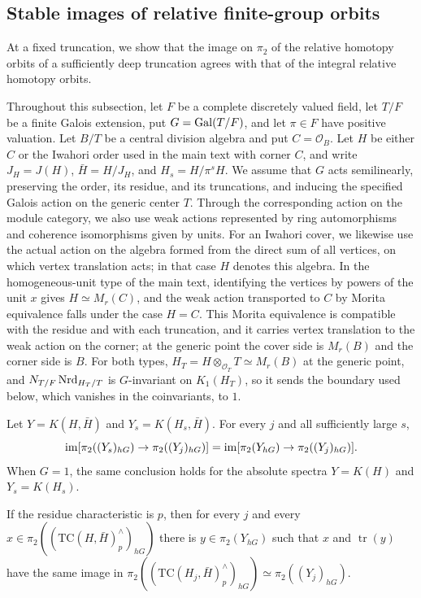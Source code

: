 \subsection{Stable images of relative finite-group orbits}
At a fixed truncation, we show that the image on $\pi_2$ of the relative homotopy orbits of a sufficiently deep truncation agrees with that of the integral relative homotopy orbits.

Throughout this subsection, let $F$ be a complete discretely valued field, let $T/F$ be a finite Galois extension, put $G=\operatorname{Gal}(T/F)$, and let $\pi\in F$ have positive valuation.
Let $B/T$ be a central division algebra and put $C=\mathcal O_B$.
Let $H$ be either $C$ or the Iwahori order used in the main text with corner $C$, and write $J_H=J(H)$, $\bar H=H/J_H$, and $H_s=H/\pi^sH$.
We assume that $G$ acts semilinearly, preserving the order, its residue, and its truncations, and inducing the specified Galois action on the generic center $T$.
Through the corresponding action on the module category, we also use weak actions represented by ring automorphisms and coherence isomorphisms given by units.
For an Iwahori cover, we likewise use the actual action on the algebra formed from the direct sum of all vertices, on which vertex translation acts; in that case $H$ denotes this algebra.
In the homogeneous-unit type of the main text, identifying the vertices by powers of the unit $x$ gives $H\simeq M_r(C)$, and the weak action transported to $C$ by Morita equivalence falls under the case $H=C$.
This Morita equivalence is compatible with the residue and with each truncation, and it carries vertex translation to the weak action on the corner; at the generic point the cover side is $M_r(B)$ and the corner side is $B$.
For both types, $H_T=H\otimes_{\mathcal O_T}T\simeq M_r(B)$ at the generic point, and $N_{T/F}\operatorname{Nrd}_{H_T/T}$ is $G$-invariant on $K_1(H_T)$, so it sends the boundary used below, which vanishes in the coinvariants, to $1$.

\begin{lemma}
\label{lem:app-orbit-stable-image}
Let $Y=K(H,\bar H)$ and $Y_s=K(H_s,\bar H)$.
For every $j$ and all sufficiently large $s$,
\[
 \operatorname{im}[\pi_2((Y_s)_{hG})\to\pi_2((Y_j)_{hG})]
 =\operatorname{im}[\pi_2(Y_{hG})\to\pi_2((Y_j)_{hG})]
.
\]
When $G=1$, the same conclusion holds for the absolute spectra $Y=K(H)$ and $Y_s=K(H_s)$.

If the residue characteristic is $p$, then for every $j$ and every $x\in\pi_2((\mathrm{TC}(H,\bar H)^\wedge_p)_{hG})$ there is $y\in\pi_2(Y_{hG})$ such that $x$ and $\operatorname{tr}(y)$ have the same image in $\pi_2((\mathrm{TC}(H_j,\bar H)^\wedge_p)_{hG})\simeq\pi_2((Y_j)_{hG})$.
\end{lemma}

